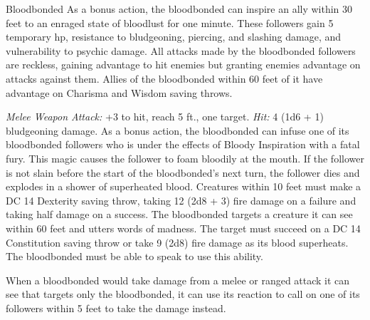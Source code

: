 \documentclass[10pt,a4paper,twoside,twocolumn,openany,bg=print,nodeprecatedcode]{dndbook}
\begin{document}
\begin{DndMonster}[float*=t]{Bloodbonded}
\DndMonsterBasics[
armor-class = {16 (studded leather armor)},
hit-points = {\DndDice{12d8 + 12}},
speed = {{'number': 30, 'condition': '(or 10 ft. if missing a leg)'} ft.}
]
\DndMonsterAbilityScores[
 str = 12,
 dex = 15,
 con = 13,
 int = 15,
 wis = 7,
 cha = 18
]
\DndMonsterDetails[
saving-throws = {Con +3, Wis +0},
skills = {Deception +6, Insight +0, Persuasion +6},
damage-vulnerabilities = {psychic},
damage-resistances = {necrotic, radiant},
languages = {Celestial, Infernal, one national language},
challenge = 4,
]
As a bonus action, the bloodbonded can inspire an ally within 30 feet to an enraged state of bloodlust for one minute. These followers gain 5 temporary hp, resistance to bludgeoning, piercing, and slashing damage, and vulnerability to psychic damage. All attacks made by the bloodbonded followers are reckless, gaining advantage to hit enemies but granting enemies advantage on attacks against them.
Allies of the bloodbonded within 60 feet of it have advantage on Charisma and Wisdom saving throws.
\par
{}
\textsl{Melee Weapon Attack:} +3 to hit, reach 5 ft., one target. \textsl{Hit:} 4 (1d6 + 1) bludgeoning damage.
As a bonus action, the bloodbonded can infuse one of its bloodbonded followers who is under the effects of Bloody Inspiration with a fatal fury. This magic causes the follower to foam bloodily at the mouth. If the follower is not slain before the start of the bloodbonded's next turn, the follower dies and explodes in a shower of superheated blood. Creatures within 10 feet must make a DC 14 Dexterity saving throw, taking 12 (2d8 + 3) fire damage on a failure and taking half damage on a success.
The bloodbonded targets a creature it can see within 60 feet and utters words of madness. The target must succeed on a DC 14 Constitution saving throw or take 9 (2d8) fire damage as its blood superheats. The bloodbonded must be able to speak to use this ability.
\par
{}
When a bloodbonded would take damage from a melee or ranged attack it can see that targets only the bloodbonded, it can use its reaction to call on one of its followers within 5 feet to take the damage instead.
\end{DndMonster}
\end{document}
